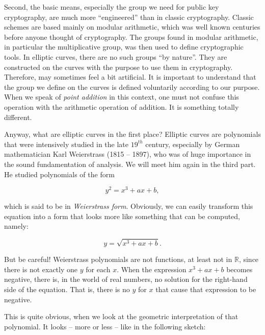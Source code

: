 \documentclass[tikz]{scrreprt}
\begin{document}
Second, the basic means, especially the group
we need for public key cryptography, are
much more ``engineered'' than in classic
cryptography. Classic schemes are based
mainly on modular arithmetic, which was
well known centuries before anyone thought
of cryptography. The groups found in modular
arithmetic, in particular the multiplicative
group, was then used to define cryptographic tools.
In elliptic curves, there are no such groups
``by nature''. They are constructed on the
curves with the purpose to use them in cryptography.
Therefore,  may sometimes feel a bit
artificial. It is important to understand that
the group we define on the curves is defined
voluntarily according to our purpose.
When we speak of \emph{point addition} in this
context, one must not confuse this operation
with the arithmetic operation of addition.
It is something totally different.

Anyway, what are elliptic curves in the first place?
Elliptic curves are polynomials that were
intensively studied in the late $19^{th}$ century,
especially by German mathematician Karl Weierstrass (1815 -- 1897),
who was of huge importance in the sound fundamentation
of analysis. We will meet him again in the third part.
He studied polynomials of the form

\begin{equation}
  y^2 = x^3 + ax + b,
\end{equation}

which is said to be in \emph{Weierstrass form}.
Obviously, we can easily transform this equation
into a form that looks more like something that
can be computed, namely:

\begin{equation}
  y = \sqrt{x^3 + ax + b}.
\end{equation}

But be careful! Weierstrass polynomials are not functions,
at least not in $\mathbb{R}$, since there is not exactly
one $y$ for each $x$. When the expression $x^3 + ax + b$
becomes negative, there is, in the world of real numbers, 
no solution for the right-hand side of the equation.
That is, there is no $y$ for $x$ that cause that expression
to be negative.

This is quite obvious, when we look at the geometric
interpretation of that polynomial. It looks -- more or less --
like in the following sketch:

\begin{center}
\end{center}
\end{document}
